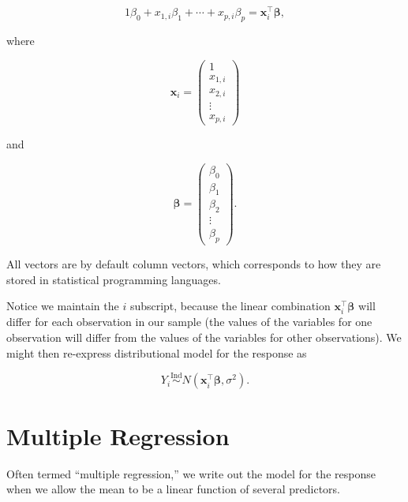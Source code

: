 \documentclass[
  letterpaper,
  DIV=11,
  numbers=noendperiod]{scrreprt}
\theoremstyle{definition}
\theoremstyle{plain}
\theoremstyle{definition}
\theoremstyle{remark}
\begin{document}
\[1 \beta_0 + x_{1,i} \beta_1 + \dotsb + x_{p,i} \beta_p = \mathbf{x}_i^\top \boldsymbol{\beta},\]

where

\[\mathbf{x}_i = \begin{pmatrix} 1 \\x_{1,i} \\ x_{2,i} \\ \vdots \\ x_{p,i} \end{pmatrix}\]

and

\[\boldsymbol{\beta} = \begin{pmatrix} \beta_0 \\ \beta_1 \\ \beta_2 \\ \vdots \\ \beta_p \end{pmatrix}.\]

\begin{tcolorbox}[enhanced jigsaw, rightrule=.15mm, leftrule=.75mm, opacityback=0, coltitle=black, bottomrule=.15mm, opacitybacktitle=0.6, left=2mm, colframe=quarto-callout-note-color-frame, breakable, colback=white, arc=.35mm, toprule=.15mm, toptitle=1mm, bottomtitle=1mm, title=\textcolor{quarto-callout-note-color}{\faInfo}\hspace{0.5em}{Note}, titlerule=0mm, colbacktitle=quarto-callout-note-color!10!white]

All vectors are by default column vectors, which corresponds to how they
are stored in statistical programming languages.

\end{tcolorbox}

Notice we maintain the \(i\) subscript, because the linear combination
\(\mathbf{x}_i^\top \boldsymbol{\beta}\) will differ for each
observation in our sample (the values of the variables for one
observation will differ from the values of the variables for other
observations). We might then re-express distributional model for the
response as

\[Y_i \stackrel{\text{Ind}}{\sim} N\left(\mathbf{x}_i^\top \boldsymbol{\beta}, \sigma^2\right).\]

\section{Multiple Regression}\label{multiple-regression}

Often termed ``multiple regression,'' we write out the model for the
response when we allow the mean to be a linear function of several
predictors.
\end{document}
